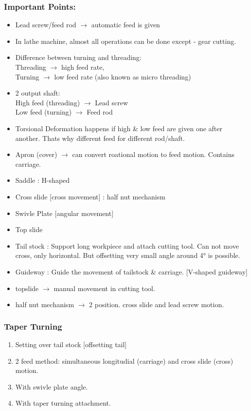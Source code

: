 \documentclass{article}
\begin{document}
\begin{multicols}{2}
\subsubsection*{Important Points:}
\begin{itemize}
  \item Lead screw/feed rod $\rightarrow$ automatic feed is given 
  \item In lathe machine, almost all operations can be done except - gear cutting. 
  \item Difference between turning and threading: \\Threading $\rightarrow$ high feed rate, \\Turning $\rightarrow$ low feed rate (also known as micro threading) 
  \item 2 output shaft:\\ High feed (threading) $\rightarrow$ Lead screw \\Low feed (turning) $\rightarrow$ Feed rod 
  \item Torsional Deformation happens if high \& low feed are given one after another. Thats why different feed for different rod/shaft.
  \item Apron (cover) $\rightarrow$ can convert roational motion to feed motion. Contains carriage. 
  \item Saddle : H-shaped 
  \item Cross slide [cross movement] : half nut mechanism 
  \item Swivle Plate [angular movement] 
  \item Top slide 
  \item Tail stock : Support long workpiece and attach cutting tool. Can not move cross, only horizontal. But offsetting very small angle around 4° is possible.
  \item Guideway : Guide the movement of tailstock \& carriage. [V-shaped guideway]  
  \item topslide $\rightarrow$ manual movement in cutting tool. 
  \item half nut mechanism  $\rightarrow$ 2 position. cross slide and lead screw motion. 
\end{itemize}

\subsubsection*{Taper Turning}
\begin{enumerate}
  \item Setting over tail stock [offsetting tail]
  \item 2 feed method: simultaneous longitudial (carriage) and cross slide (cross) motion. 
  \item With swivle plate angle. 
  \item With taper turning attachment. 
\end{enumerate}


\end{multicols}
\end{document}
